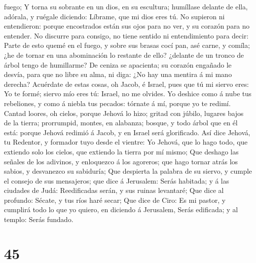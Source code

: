 fuego;  Y torna su sobrante en un dios, en su escultura;
humíllase delante de ella, adórala, y ruégale diciendo: Líbrame, que mi
dios eres tú.  No supieron ni entendieron: porque
encostrados están sus ojos para no ver, y su corazón para no entender.
 No discurre para consigo, no tiene sentido ni
entendimiento para decir: Parte de esto quemé en el fuego, y sobre sus
brasas cocí pan, asé carne, y comíla; ¿he de tornar en una abominación
lo restante de ello? ¿delante de un tronco de árbol tengo de humillarme?
 De ceniza se apacienta; su corazón engañado le desvía,
para que no libre su alma, ni diga: ¿No hay una mentira á mi mano
derecha?  Acuérdate de estas cosas, oh Jacob, é Israel,
pues que tú mi siervo eres: Yo te formé; siervo mío eres tú: Israel, no
me olvides.  Yo deshice como á nube tus rebeliones, y como
á niebla tus pecados: tórnate á mí, porque yo te redimí. 
Cantad loores, oh cielos, porque Jehová lo hizo; gritad con júbilo,
lugares bajos de la tierra; prorrumpid, montes, en alabanza; bosque, y
todo árbol que en él está: porque Jehová redimió á Jacob, y en Israel
será glorificado.  Así dice Jehová, tu Redentor, y formador
tuyo desde el vientre: Yo Jehová, que lo hago todo, que extiendo solo
los cielos, que extiendo la tierra por mí mismo;  Que
deshago las señales de los adivinos, y enloquezco á los agoreros; que
hago tornar atrás los sabios, y desvanezco su sabiduría; 
Que despierta la palabra de su siervo, y cumple el consejo de sus
mensajeros; que dice á Jerusalem: Serás habitada; y á las ciudades de
Judá: Reedificadas serán, y sus ruinas levantaré;  Que dice
al profundo: Sécate, y tus ríos haré secar;  Que dice de
Ciro: Es mi pastor, y cumplirá todo lo que yo quiero, en diciendo á
Jerusalem, Serás edificada; y al templo: Serás fundado.

\hypertarget{section-44}{%
\section{45}\label{section-44}}

